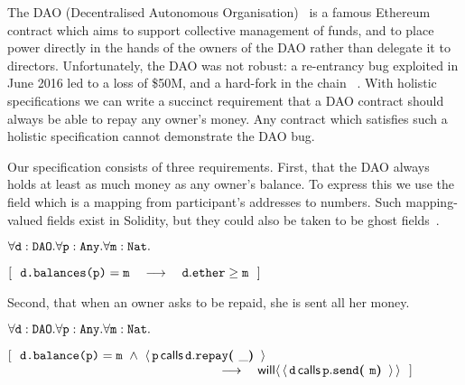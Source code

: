 The DAO  {(Decentralised Autonomous Organisation)}~\cite{Dao}  is a famous Ethereum contract  which aims to support
collective management of funds,  and to place power directly in the
hands of the owners of the DAO
rather than delegate it to directors.
Unfortunately, the DAO was not robust:
a re-entrancy bug   exploited in June 2016 led  to a loss of   \$50M, and
a hard-fork in the  chain ~\cite{DaoBug}.
%
With holistic specifications  we can  write a succinct requirement that a
DAO contract should always be able to repay any owner's money.
Any contract which satisfies such a holistic specification cannot demonstrate the DAO bug.
 
Our specification consists of three requirements.
First, that the DAO always holds at least as 
much money as any owner's balance.
To express this we use 
the field  which is a mapping from participant's addresses to 
numbers. Such mapping-valued fields exist in Solidity, but they could
also be taken to be ghost fields~\cite{ghost}.
  
\vspace{.1cm}

\noindent
 \strut \hspace{0.5cm} $\forall \prg{d}:\prg{DAO}.\forall \prg{p}:\prg{Any}.\forall\prg{m}:\prg{Nat}.$\\
\strut \hspace{0.5cm} $[\ \ \prg{d.balances(p)}=\prg{m}  \ \ \  \longrightarrow  \ \ \ \prg{d}.\prg{ether}\geq \prg{m} \ \ ] $


\noindent
Second, that when an owner asks to be repaid, she is sent all her money.
\vspace{.1cm}

\noindent
 \strut \hspace{0.5cm} $\forall \prg{d}:\prg{DAO}.\forall \prg{p}:\prg{Any}.\forall\prg{m}:\prg{Nat}.$\\
\strut \hspace{0.5cm} $[\ \ \prg{d.balance(p)}=\prg{m}
 \ \wedge \ \Calls{\prg{p}}{\prg{repay}}{\prg{d}}{\_}  $\\
 $\strut \hspace{5.5cm}   \ \ \  \longrightarrow  \ \ \  \Future{\Calls{\prg{d}}{\prg{send}}{\prg{p}}{\prg{m}}}\ \ ] $  
\vspace{.1cm}


